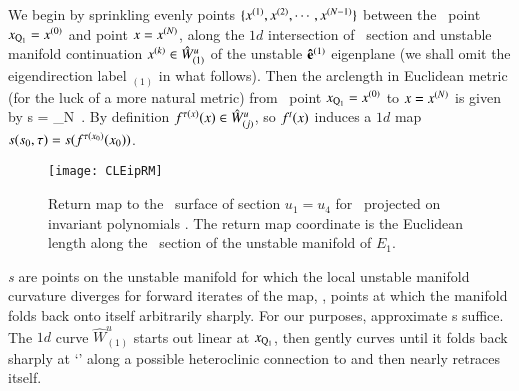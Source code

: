 We begin by sprinkling evenly points
$\{x^{(1)},x^{(2)},\cdots,x^{(N-1)}\}$ between the
\reqv\ point $x_{\mathrm{Q}_{1}}=x^{(0)}$ and point  $x=
x^{(N)}$, along the $1d$ intersection of \Poincare\ section and
unstable manifold continuation $x^{(k)} \in \hat{W}^u_{(1)}$ of the unstable ${\bf
\hat{e}}^{(1)}$ eigen\-plane (we shall omit the
eigen\-direction label ${}_{(1)}$ in what follows). Then the
arclength in Euclidean metric (for the luck of a more natural metric)
from \reqv\ point $x_{\mathrm{Q}_{1}}=x^{(0)}$ to $x=
x^{(N)}$ is given by
\beq
s = \lim_{N\to\infty}
\,.
By definition $f^{\tau(x)}(x) \in \hat{W}^u_{(j)}$, so
$f^t(x)$ induces a $1d$ map $s(s_0,\tau) =
s(f^{\tau({x_0})}({x_0}))$.

\begin{figure}[ht]
\begin{center}
\texttt{[image: CLEipRM]}
\end{center}
\caption{
Return map to the \Poincare\ surface of section $u_1=u_4$ for
\cLe\ projected on invariant polynomials .
The return map coordinate is the Euclidean length along the
\Poincare\ section of the unstable manifold of $E_1$.
    }
\label{fig:CLEipRM}
\end{figure}

{\em \Turn s} are points on the unstable
manifold for which the local unstable manifold curvature diverges
for forward iterates of the map, \ie, points at which the manifold
folds back onto itself arbitrarily sharply.
For our purposes,
approximate \turn s suffice.
The $1d$ curve $\hat{W}^u_{(1)}$ starts out linear at
$x_{\mathrm{Q}_{1}}$, then gently curves until it folds back sharply
at `\turn' along a possible heteroclinic connection to 
and then nearly retraces itself.

